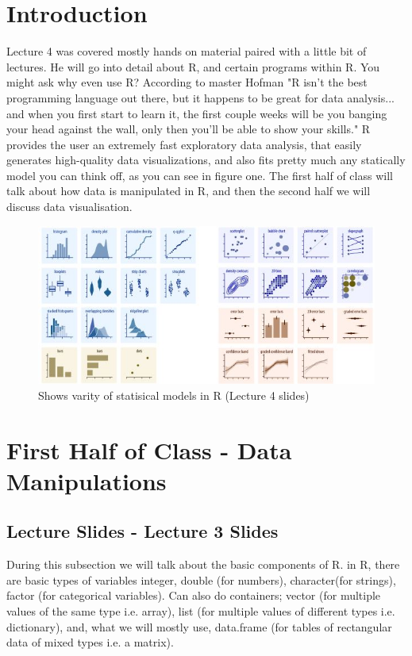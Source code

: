




\maketitle {}

\section{Introduction}
Lecture 4 was covered mostly hands on material paired with a little bit of lectures. He will go into detail about R, and certain programs within R. You might ask why even use R? According to master Hofman "R isn't the best programming language out there, but it happens to be great for data analysis... and when you first start to learn it, the first couple weeks will be you banging your head against the wall, only then you'll be able to show your skills." R provides the user an extremely fast exploratory data analysis, that easily generates high-quality data visualizations, and also fits pretty much any statically model you can think off, as you can see in figure one. The first half of class will talk about how data is manipulated in R, and then the second half we will discuss data visualisation.
\begin{figure}[h!]
  \caption{ Shows varity of statisical models in R (Lecture 4 slides)}
  \includegraphics[width=\textwidth]{figures/MSDimage1}
\end{figure}

\section{First Half of Class - Data Manipulations}
\subsection{Lecture Slides - Lecture 3 Slides}
During this subsection we will talk about the basic components of R. in R, there are basic types of variables integer, double (for numbers), character(for strings), factor (for categorical variables). Can also do containers; vector (for multiple values of the same type i.e. array), list (for multiple values of different types i.e. dictionary), and, what we will mostly use, data.frame (for tables of rectangular data of mixed types i.e. a matrix). 

